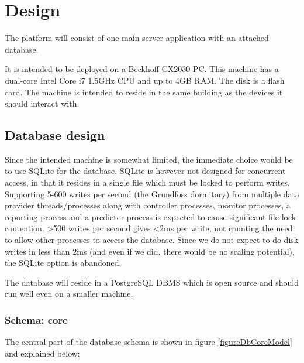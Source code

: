 \chapter{Design}
The platform will consist of one main server application with an attached database. 

It is intended to be deployed on a Beckhoff CX2030 PC. This machine has a dual-core Intel Core i7 1.5GHz CPU and up to 4GB RAM. The disk is a flash card. The machine is intended to reside in the same building as the devices it should interact with.

\section{Database design}
Since the intended machine is somewhat limited, the immediate choice would be to use SQLite for the database.
SQLite is however not designed for concurrent access, in that it resides in a single file which must be locked to perform writes. Supporting 5-600 writes per second (the Grundfoss dormitory) from multiple data provider threads/processes along with controller processes, monitor processes, a reporting process and a predictor process is expected to cause significant file lock contention. \textgreater500 writes per second gives \textless2ms per write, not counting the need to allow other processes to access the database. Since we do not expect to do disk writes in less than 2ms (and even if we did, there would be no scaling potential), the SQLite option is abandoned.

The database will reside in a PostgreSQL DBMS which is open source and should run well even on a smaller machine.

\subsection{Schema: core}
The central part of the database schema is shown in figure \ref{figureDbCoreModel} and explained below:

